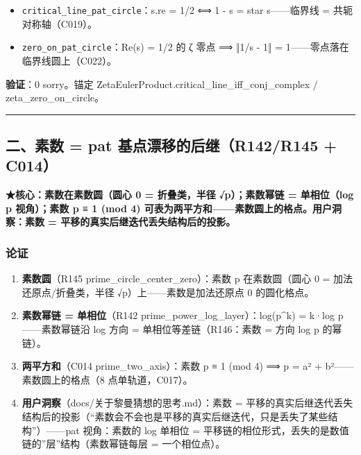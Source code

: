 \documentclass[
]{article}
\providecommand{\tightlist}{%
 \setlength{\itemsep}{0pt}\setlength{\parskip}{0pt}}
\begin{document}
\begin{itemize}
\tightlist
\item
 \texttt{critical\_line\_pat\_circle}：s.re = 1/2 ⟺ 1 - s = star
 s------临界线 = 共轭对称轴（C019）。
\item
 \texttt{zero\_on\_pat\_circle}：Re(s) = 1/2 的 ζ 零点 ⟹ ‖1/s - 1‖ =
 1------零点落在临界线圆上（C022）。
\end{itemize}

\textbf{验证}：0 sorry。锚定
ZetaEulerProduct.critical\_line\_iff\_conj\_complex /
zeta\_zero\_on\_circle。

\begin{center}\rule{0.5\linewidth}{0.5pt}\end{center}

\subsection{二、素数 = pat 基点漂移的后继（R142/R145 +
C014）}\label{ux4e8cux7d20ux6570-pat-ux57faux70b9ux6f02ux79fbux7684ux540eux7ee7r142r145-c014}

\textbf{★核心：素数在素数圆（圆心 0 = 折叠类，半径 √p）；素数幂链 =
单相位（log p 视角）；素数 p ≡ 1 (mod 4)
可表为两平方和------素数圆上的格点。用户洞察：素数 =
平移的真实后继迭代丢失结构后的投影。}

\subsubsection{论证}\label{ux8bbaux8bc1-1}

\begin{enumerate}
\def\labelenumi{\arabic{enumi}.}
\tightlist
\item
 \textbf{素数圆}（R145 prime\_circle\_center\_zero）：素数 p
 在素数圆（圆心 0 = 加法还原点/折叠类，半径
 √p）上------素数是加法还原点 0 的圆化格点。
\item
 \textbf{素数幂链 = 单相位}（R142
 prime\_power\_log\_layer）：log(p\^{}k) = k·log p------素数幂链沿 log
 方向 = 单相位等差链（R146：素数 = 方向 log p 的幂链）。
\item
 \textbf{两平方和}（C014 prime\_two\_axis）：素数 p ≡ 1 (mod 4) ⟹ p =
 a² + b²------素数圆上的格点（8 点单轨道，C017）。
\item
 \textbf{用户洞察}（docs/关于黎曼猜想的思考.md）：素数 =
 平移的真实后继迭代丢失结构后的投影（``素数会不会也是平移的真实后继迭代，只是丢失了某些结构''）------pat
 视角：素数的 log 单相位 =
 平移链的相位形式，丢失的是数值链的''层''结构（素数幂链每层 =
 一个相位点）。
\end{enumerate}
\end{document}
